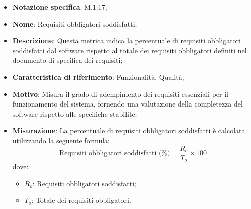 \begin{itemize}
    \item \textbf{Notazione specifica}: M.1.17;
    \item \textbf{Nome}: Requisiti obbligatori soddisfatti;
    \item \textbf{Descrizione}: Questa metrica indica la percentuale di requisiti obbligatori soddisfatti dal software rispetto al totale dei requisiti obbligatori definiti nel documento di specifica dei requisiti;
    \item \textbf{Caratteristica di riferimento}: Funzionalità, Qualità;
    \item \textbf{Motivo}: Misura il grado di adempimento dei requisiti essenziali per il funzionamento del sistema, fornendo una valutazione della completezza del software rispetto alle specifiche stabilite;
    \item \textbf{Misurazione}: La percentuale di requisiti obbligatori soddisfatti è calcolata utilizzando la seguente formula:
    \[
    \text{Requisiti obbligatori soddisfatti (\%)} = \frac{R_{o}}{T_{o}} \times 100
    \]
    dove:
    \begin{itemize}
        \item $R_{o}$: Requisiti obbligatori soddisfatti;
        \item $T_{o}$: Totale dei requisiti obbligatori.
    \end{itemize}
\end{itemize}
